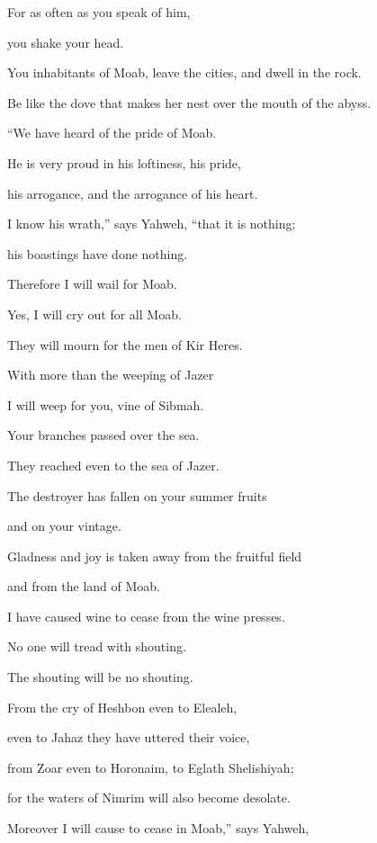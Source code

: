 {\par }{\Q For as often as you speak of him,
\par }{\QB you shake your head.
\par }{\Q {}You inhabitants of Moab, leave the cities, and dwell in the rock.
\par }{\QB Be like the dove that makes her nest over the mouth of the abyss.
\par }{\BB \par }{\Q {}“We have heard of the pride of Moab.
\par }{\QB He is very proud in his loftiness, his pride,
\par }{\QB his arrogance, and the arrogance of his heart.
\par }{\Q {}I know his wrath,” says Yahweh, “that it is nothing;
\par }{\QB his boastings have done nothing.
\par }{\Q {}Therefore I will wail for Moab.
\par }{\QB Yes, I will cry out for all Moab.
\par }{\QB They will mourn for the men of Kir Heres.
\par }{\Q {}With more than the weeping of Jazer
\par }{\QB I will weep for you, vine of Sibmah.
\par }{\Q Your branches passed over the sea.
\par }{\QB They reached even to the sea of Jazer.
\par }{\Q The destroyer has fallen on your summer fruits
\par }{\QB and on your vintage.
\par }{\Q {}Gladness and joy is taken away from the fruitful field
\par }{\QB and from the land of Moab.
\par }{\Q I have caused wine to cease from the wine presses.
\par }{\QB No one will tread with shouting.
\par }{\QB The shouting will be no shouting.
\par }{\Q {}From the cry of Heshbon even to Elealeh,
\par }{\QB even to Jahaz they have uttered their voice,
\par }{\QB from Zoar even to Horonaim, to Eglath Shelishiyah;
\par }{\QB for the waters of Nimrim will also become desolate.
\par }{\Q {}Moreover I will cause to cease in Moab,” says Yahweh,
}

